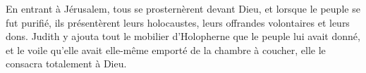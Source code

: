 En entrant à Jérusalem, tous se prosternèrent devant Dieu,
	et lorsque le peuple se fut purifié, ils présentèrent leurs holocaustes,
	leurs offrandes volontaires et leurs dons.
Judith y ajouta tout le mobilier d'Holopherne que le peuple lui avait donné,
	et le voile qu'elle avait elle-même emporté de la chambre à coucher,
	elle le consacra totalement à Dieu.
